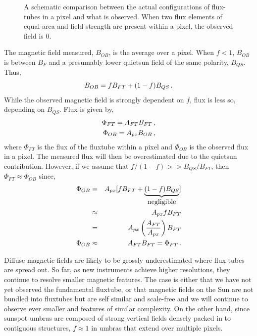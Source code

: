 \begin{figure}[!t]
\caption[A schematic comparison between actual and observed flux-tubes.]{A schematic comparison between the actual configurations of flux-tubes in a pixel and what is observed. When two flux elements of equal area and field strength are present within a pixel, the observed field is 0.}
\label{fig:ftschem2}
\end{figure}

The magnetic field measured, $B_{OB}$, is the average over a pixel. When $f < 1$, $B_{OB}$ is between $B_{F}$ and a presumably lower \gls{quietsun} field of the same polarity, $B_{QS}$. Thus,
\begin{equation}
B_{OB}=f B_{FT} + (1-f)B_{QS} \mbox{\,.}
\end{equation}
While the observed magnetic field is strongly dependent on $f$, flux is less so, depending on $B_{QS}$. Flux is given by,
\begin{eqnarray}
\Phi_{FT} = A_{FT} B_{FT} \mbox{\,,} \\
\Phi_{OB} = A_{px} B_{OB} \mbox{\,,}
\end{eqnarray}
where $\Phi_{FT}$ is the flux of the \gls{fluxtube} within a pixel and $\Phi_{OB}$ is the observed flux in a pixel. The measured flux will then be overestimated due to the \gls{quietsun} contribution. However, if we assume that $f/(1-f) >> B_{QS}/B_{FT}$, then $\Phi_{FT} \approx \Phi_{OB}$ since,
\begin{eqnarray}
\Phi_{OB} &=& A_{px} [f B_{FT} + \underbrace{(1-f)B_{QS}}_{\mbox{negligible}}] \\
 &\approx& A_{px} f B_{FT} \\
 &=& A_{px} \left( \frac{A_{FT}}{A_{px}} \right) B_{FT} \\
\Phi_{OB} &\approx& A_{FT} B_{FT} = \Phi_{FT} \mbox{\,.}
\end{eqnarray}

Diffuse magnetic fields are likely to be grossly underestimated where flux tubes are spread out. So far, as new instruments achieve higher resolutions, they continue to resolve smaller magnetic features. The case is either that we have not yet observed the fundamental \gls{fluxtube}, or that magnetic fields on the Sun are not bundled into \glspl{fluxtube} but are self similar and scale-free and we will continue to observe ever smaller and features of similar complexity. On the other hand, since sunspot \glspl{umbra} are composed of strong vertical fields densely packed in to contiguous structures, $f \approx 1$ in \glspl{umbra} that extend over multiple pixels.

